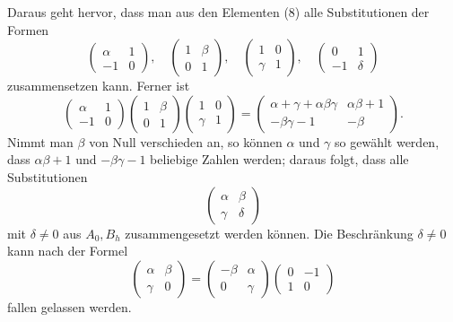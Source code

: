 \documentclass[11pt]{article}
\begin{document}
Daraus geht hervor, dass man aus den Elementen (8) alle Substitutionen der Formen
\[
 \begin{pmatrix}\alpha&1\\-1&0\end{pmatrix},\quad
 \begin{pmatrix}1&\beta\\0&1\end{pmatrix},\quad
 \begin{pmatrix}1&0\\\gamma&1\end{pmatrix},\quad
 \begin{pmatrix}0&1\\-1&\delta\end{pmatrix}
\]
zusammensetzen kann. Ferner ist
\begin{equation}
 \begin{pmatrix}\alpha&1\\-1&0\end{pmatrix}
 \begin{pmatrix}1&\beta\\0&1\end{pmatrix}
 \begin{pmatrix}1&0\\\gamma&1\end{pmatrix}
 =
 \begin{pmatrix}\alpha+\gamma+\alpha\beta\gamma&\alpha\beta+1\\
 -\beta\gamma-1&-\beta
 \end{pmatrix}. \tag{11}
\end{equation}
Nimmt man $\beta$ von Null verschieden an, so können $\alpha$ und $\gamma$ so gewählt werden, dass $\alpha\beta+1$ und $-\beta\gamma-1$ beliebige Zahlen werden; daraus folgt, dass alle Substitutionen
\[
 \begin{pmatrix}\alpha&\beta\\\gamma&\delta\end{pmatrix}
\]
mit $\delta\ne0$ aus $A_0,B_h$ zusammengesetzt werden können. Die Beschränkung $\delta\ne0$ kann nach der Formel
\[
 \begin{pmatrix}\alpha&\beta\\\gamma&0\end{pmatrix}
 =
 \begin{pmatrix}-\beta&\alpha\\0&\gamma\end{pmatrix}
 \begin{pmatrix}0&-1\\1&0\end{pmatrix}
\]
fallen gelassen werden.
\end{document}
